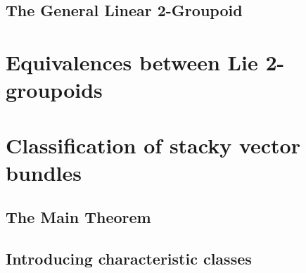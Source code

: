 

\section{The General Linear 2-Groupoid}\label{sec:gl2gpd}




\chapter{Equivalences between Lie 2-groupoids}\label{ch:equivalences}










\chapter{Classification of stacky vector bundles}\label{ch:main-thm}



\section{The Main Theorem}



\section{Introducing characteristic classes}

